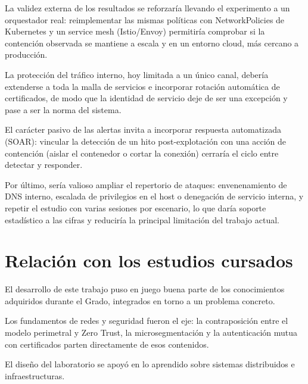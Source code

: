 \documentclass[11pt,spanish,listoffigures,listoftables]{tfgetsinf}
\begin{document}
        La validez externa de los resultados se reforzaría llevando el experimento a un orquestador real: reimplementar las mismas políticas con NetworkPolicies de Kubernetes y un service mesh (Istio/Envoy) permitiría comprobar si la contención observada se mantiene a escala y en un entorno cloud, más cercano a producción.
        
        La protección del tráfico interno, hoy limitada a un único canal, debería extenderse a toda la malla de servicios e incorporar rotación automática de certificados, de modo que la identidad de servicio deje de ser una excepción y pase a ser la norma del sistema.

        
        
        El carácter pasivo de las alertas invita a incorporar respuesta automatizada (SOAR): vincular la detección de un hito post-explotación con una acción de contención (aislar el contenedor o cortar la conexión) cerraría el ciclo entre detectar y responder.
        
        Por último, sería valioso ampliar el repertorio de ataques: envenenamiento de DNS interno, escalada de privilegios en el host o denegación de servicio interna, y repetir el estudio con varias sesiones por escenario, lo que daría soporte estadístico a las cifras y reduciría la principal limitación del trabajo actual.

        \section{Relación con los estudios cursados}
        El desarrollo de este trabajo puso en juego buena parte de los conocimientos adquiridos durante el Grado, integrados en torno a un problema concreto. 

        Los fundamentos de redes y seguridad fueron el eje: la contraposición entre el modelo perimetral y Zero Trust, la microsegmentación y la autenticación mutua con certificados parten directamente de esos contenidos. 
        
        El diseño del laboratorio se apoyó en lo aprendido sobre sistemas distribuidos e infraestructuras.
        
\end{document}
